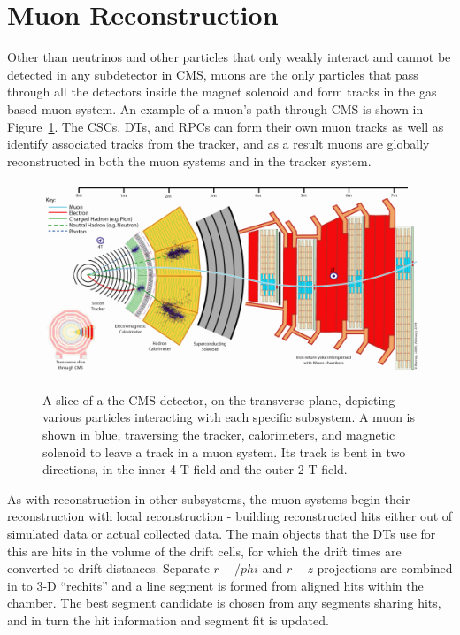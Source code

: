 \section{Muon Reconstruction}
\label{muonreco}

Other than neutrinos and other particles that only weakly interact and cannot be detected in any subdetector in CMS, muons are the only particles that pass through all the detectors inside the magnet solenoid and form tracks in the gas based muon system.  An example of a muon's path through CMS is shown in Figure~\ref{figapp:CMSSlice}.  The CSCs, DTs, and RPCs can form their own muon tracks as well as identify associated tracks from the tracker, and as a result muons are globally reconstructed in both the muon systems and in the tracker system.

\begin{figure}[!Hh]
       \centering
       \includegraphics[scale=0.4]{Figures/CMS_Slice.png} \\
       \caption[A transverse slice of the CMS detector]{A slice of a the CMS detector, on the transverse plane, depicting various particles interacting with each specific subsystem.  A muon is shown in blue, traversing the tracker, calorimeters, and magnetic solenoid to leave a track in a muon system.  Its track is bent in two directions, in the inner 4 T field and the outer 2 T field.}
\label{figapp:CMSSlice}
\end{figure}

As with reconstruction in other subsystems, the muon systems begin their reconstruction with local reconstruction - building reconstructed hits either out of simulated data or actual collected data.  The main objects that the DTs use for this are hits in the volume of the drift cells, for which the drift times are converted to drift distances.  Separate $r-/phi$ and $r-z$ projections are combined in to 3-D ``rechits'' and a line segment is formed from aligned hits within the chamber.  The best segment candidate is chosen from any segments sharing hits, and in turn the hit information and segment fit is updated.  

